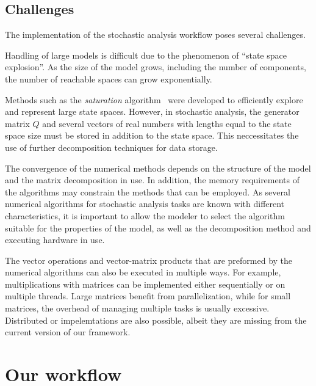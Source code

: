\subsection{Challenges}

The implementation of the stochastic analysis workflow poses several
challenges.

Handling of large models is difficult due to the phenomenon of
\enquote{state space explosion}. As the size of the model grows,
including the number of components, the number of reachable spaces can
grow exponentially.

Methods such as the \emph{saturation} algorithm~\citep{Ciardo:2006}
were developed to efficiently explore and represent large state
spaces. However, in stochastic analysis, the generator matrix $Q$ and
several vectors of real numbers with lengths equal to the state space
size must be stored in addition to the state space. This neccessitates
the use of further decomposition techniques for data storage.

The convergence of the numerical methods depends on the structure of
the model and the matrix decomposition in use. In addition, the memory
requirements of the algorithms may constrain the methods that can be
employed. As several numerical algorithms for stochastic analysis
tasks are known with different characteristics, it is important to
allow the modeler to select the algorithm suitable for the properties
of the model, as well as the decomposition method and executing
hardware in use.

The vector operations and vector-matrix products that are preformed by
the numerical algorithms can also be executed in multiple ways. For
example, multiplications with matrices can be implemented either
sequentially or on multiple threads. Large matrices benefit from
parallelization, while for small matrices, the overhead of managing
multiple tasks is usually excessive. Distributed or 
impelemtations are also possible, albeit they are missing from the
current version of our framework.

\section{Our workflow}

